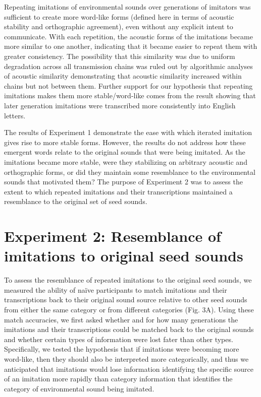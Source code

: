 \documentclass[english,floatsintext,man]{apa6}
\theoremstyle{definition}
\theoremstyle{definition}
\theoremstyle{definition}
\theoremstyle{remark}
\begin{document}
Repeating imitations of environmental sounds over generations of
imitators was sufficient to create more word-like forms (defined here in
terms of acoustic stability and orthographic agreement), even without
any explicit intent to communicate. With each repetition, the acoustic
forms of the imitations became more similar to one another, indicating
that it became easier to repeat them with greater consistency. The
possibility that this similarity was due to uniform degradation across
all transmission chains was ruled out by algorithmic analyses of
acoustic similarity demonstrating that acoustic similarity increased
within chains but not between them. Further support for our hypothesis
that repeating imitations makes them more stable/word-like comes from
the result showing that later generation imitations were transcribed
more consistently into English letters.

The results of Experiment 1 demonstrate the ease with which iterated
imitation gives rise to more stable forms. However, the results do not
address how these emergent words relate to the original sounds that were
being imitated. As the imitations became more stable, were they
stabilizing on arbitrary acoustic and orthographic forms, or did they
maintain some resemblance to the environmental sounds that motivated
them? The purpose of Experiment 2 was to assess the extent to which
repeated imitations and their transcriptions maintained a resemblance to
the original set of seed sounds.

\hypertarget{experiment-2-resemblance-of-imitations-to-original-seed-sounds}{%
\section{Experiment 2: Resemblance of imitations to original seed
sounds}\label{experiment-2-resemblance-of-imitations-to-original-seed-sounds}}

To assess the resemblance of repeated imitations to the original seed
sounds, we measured the ability of naïve participants to match
imitations and their transcriptions back to their original sound source
relative to other seed sounds from either the same category or from
different categories (Fig. 3A). Using these match accuracies, we first
asked whether and for how many generations the imitations and their
transcriptions could be matched back to the original sounds and whether
certain types of information were lost fater than other types.
Specifically, we tested the hypothesis that if imitations were becoming
more word-like, then they should also be interpreted more categorically,
and thus we anticipated that imitations would lose information
identifying the specific source of an imitation more rapidly than
category information that identifies the category of environmental sound
being imitated.
\end{document}
